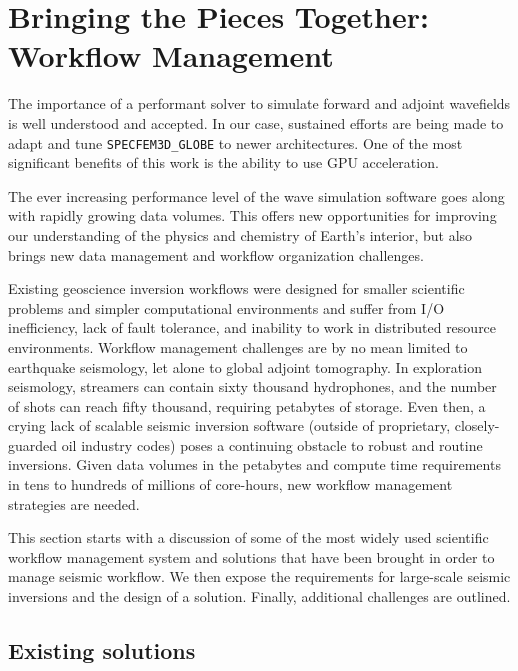
\section{Bringing the Pieces Together: Workflow Management}
\label{sec:workflow_management}


The importance of a performant solver to simulate forward and adjoint wavefields
is well understood and accepted. In our case, sustained efforts are being made
to adapt and tune \texttt{SPECFEM3D\_GLOBE} to newer architectures.
One of the most significant benefits of this work is the ability to
use GPU acceleration.

The ever increasing performance level of the wave simulation software goes along
with rapidly growing data volumes. This offers new opportunities for improving
our understanding of the physics and chemistry of Earth's interior, but also brings
new data management and workflow organization challenges.

Existing geoscience inversion workflows were designed for smaller scientific
problems and simpler computational environments and suffer from I/O
inefficiency, lack of fault tolerance, and inability to work in distributed
resource environments.
Workflow management challenges are by no mean limited to
earthquake seismology, let alone to global adjoint tomography.
In exploration seismology, streamers can contain sixty thousand hydrophones,
and the number of shots can reach fifty thousand, requiring petabytes of
storage.
Even then, a crying lack of scalable seismic inversion software (outside
of proprietary, closely-guarded oil industry codes) poses a continuing obstacle
to robust and routine inversions.
Given data volumes in the petabytes and compute time requirements in tens to
hundreds of millions of core-hours, new workflow management strategies are needed.

This section starts with a discussion of some of the most widely used scientific
workflow management system and solutions that have been brought in
order to manage seismic workflow. We then expose the requirements for large-scale
seismic inversions and the design of a solution. Finally, additional challenges
are outlined.

\subsection{Existing solutions}

